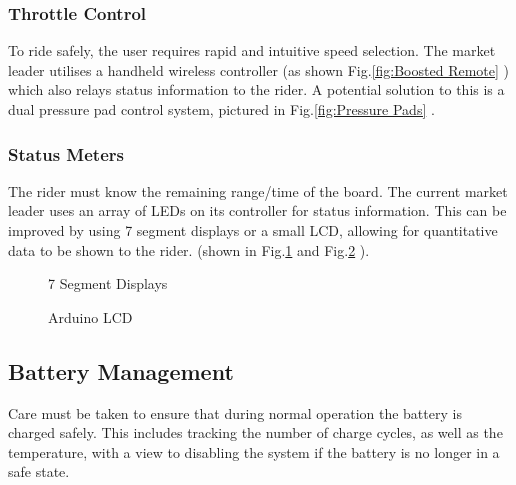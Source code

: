 \documentclass[journal,10pt]{IEEEtran}
\begin{document}
    	\subsubsection{Throttle Control}
    	    To ride safely, the user requires rapid and intuitive speed selection.
    		The market leader utilises a handheld wireless controller (as shown Fig.\ref{fig:Boosted Remote} \cite{BoostedRemote}) which also relays status information to the rider.
    		A potential solution to this is a dual pressure pad control system, pictured in Fig.\ref{fig:Pressure Pads} \cite{PressurePads}.
            
    	\subsubsection{Status Meters}
    		The rider must know the remaining range/time of the board. The current market leader uses an array of LEDs on its controller for status information. This can be improved by using 7 segment displays or a small LCD, allowing for quantitative data to be shown to the rider. (shown in Fig.\ref{fig:7 seg} \cite{7seg} and Fig.\ref{fig:LCD} \cite{LCD}).
    		
    	\begin{figure}[H]
            \centering
            \caption{7 Segment Displays}
            \label{fig:7 seg}
        \end{figure}
    	\begin{figure}[H]
            \centering
            \caption{Arduino LCD}
            \label{fig:LCD}
        \end{figure}
    \subsection{Battery Management}
    	Care must be taken to ensure that during normal operation the battery is charged safely.
    	This includes tracking the number of charge cycles, as well as the temperature, with a view to disabling the system if the battery is no longer in a safe state.
    	
\end{document}

